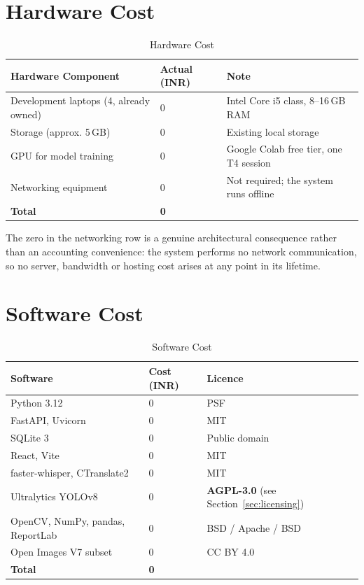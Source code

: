 \documentclass[
12pt,
a4paper,
oneside
]{report}
\begin{document}
\section{Hardware Cost}

\begin{table}[H]
\centering
\begin{tabular}{|p{6cm}|p{2.6cm}|p{3.4cm}|}
\hline
\textbf{Hardware Component} & \textbf{Actual (INR)} & \textbf{Note} \\
\hline
Development laptops (4, already owned) & 0 & Intel Core i5 class, 8--16\,GB RAM
\\
\hline
Storage (approx. 5\,GB) & 0 & Existing local storage \\
\hline
GPU for model training & 0 & Google Colab free tier, one T4 session \\
\hline
Networking equipment & 0 & Not required; the system runs offline \\
\hline
\textbf{Total} & \textbf{0} & \\
\hline
\end{tabular}
\caption{Hardware Cost}
\end{table}

The zero in the networking row is a genuine architectural consequence rather
than an accounting convenience: the system performs no network communication, so
no server, bandwidth or hosting cost arises at any point in its lifetime.

\section{Software Cost}

\begin{table}[H]
\centering
\begin{tabular}{|p{5cm}|p{2.4cm}|p{4.6cm}|}
\hline
\textbf{Software} & \textbf{Cost (INR)} & \textbf{Licence} \\
\hline
Python 3.12 & 0 & PSF \\
\hline
FastAPI, Uvicorn & 0 & MIT \\
\hline
SQLite 3 & 0 & Public domain \\
\hline
React, Vite & 0 & MIT \\
\hline
faster-whisper, CTranslate2 & 0 & MIT \\
\hline
Ultralytics YOLOv8 & 0 & \textbf{AGPL-3.0} (see
Section~\ref{sec:licensing}) \\
\hline
OpenCV, NumPy, pandas, ReportLab & 0 & BSD / Apache / BSD \\
\hline
Open Images V7 subset & 0 & CC BY 4.0 \\
\hline
\textbf{Total} & \textbf{0} & \\
\hline
\end{tabular}
\caption{Software Cost}
\end{table}
\end{document}
